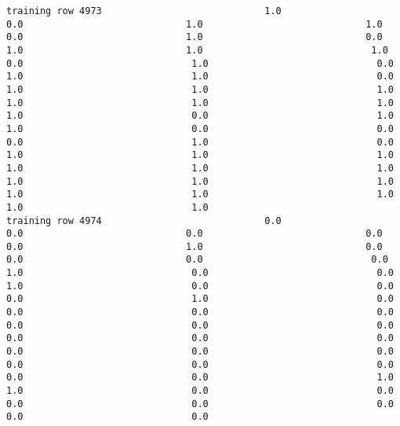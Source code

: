 \documentclass[11pt]{article}
\begin{document}
\begin{verbatim}
training row 4973                             1.0                             0.0                             1.0                             1.0                             0.0                             1.0                             0.0                             1.0                             1.0                              1.0                              0.0                              1.0                              0.0                              1.0                              1.0                              0.0                              1.0                              1.0                              1.0                              1.0                              1.0                              1.0                              1.0                              0.0                              1.0                              1.0                              0.0                              0.0                              0.0                              1.0                              0.0                              1.0                              1.0                              1.0                              1.0                              1.0                              1.0                              1.0                              1.0                              1.0                              1.0                              1.0                              1.0                              1.0                              1.0
training row 4974                             0.0                             0.0                             0.0                             0.0                             0.0                             1.0                             0.0                             0.0                             0.0                              0.0                              1.0                              0.0                              0.0                              1.0                              0.0                              0.0                              0.0                              1.0                              0.0                              0.0                              0.0                              0.0                              0.0                              0.0                              0.0                              0.0                              0.0                              0.0                              0.0                              0.0                              0.0                              0.0                              0.0                              0.0                              0.0                              0.0                              1.0                              1.0                              0.0                              0.0                              0.0                              0.0                              0.0                              0.0                              0.0

\end{verbatim}
\end{document}
